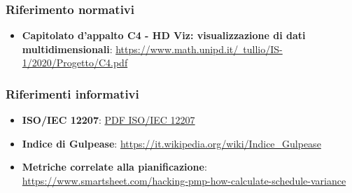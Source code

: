         \subsubsection{Riferimento normativi}
            \begin{itemize}
                \item \textbf{Capitolato d'appalto C4 - HD Viz: visualizzazione di dati multidimensionali}:
                \href{https://www.math.unipd.it/~tullio/IS-1/2020/Progetto/C4.pdf}{https://www.math.unipd.it/~tullio/IS-1/2020/Progetto/C4.pdf}
            \end{itemize}
            
        \subsubsection{Riferimenti informativi}
            \begin{itemize}
                \item \textbf{ISO/IEC 12207}:
                \href{https://www.math.unipd.it/~tullio/IS-1/2009/Approfondimenti/ISO_12207-1995.pdf}{PDF ISO/IEC 12207}
                \item \textbf{Indice di Gulpease}:
                \href{https://it.wikipedia.org/wiki/Indice_Gulpease}{https://it.wikipedia.org/wiki/Indice_Gulpease}
                \item \textbf{Metriche correlate alla pianificazione}:
                \href{https://www.smartsheet.com/hacking-pmp-how-calculate-schedule-variance}{https://www.smartsheet.com/hacking-pmp-how-calculate-schedule-variance}
            \end{itemize}

